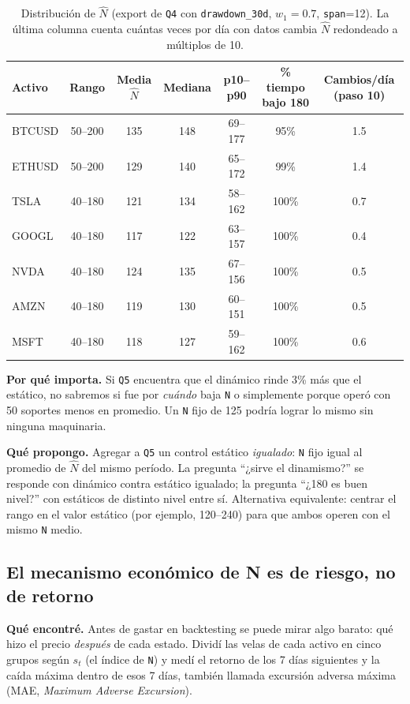 \documentclass[11pt,a4paper]{article}
\newcommand{\code}[1]{\texttt{\small #1}}
\begin{document}
\begin{table}[h]
\centering\small
\begin{tabular}{lcccccc}
\toprule
Activo & Rango & Media $\hat N$ & Mediana & p10--p90 & \% tiempo bajo 180 & Cambios/día (paso 10) \\
\midrule
BTCUSD & 50--200 & 135 & 148 & 69--177 & 95\% & 1.5 \\
ETHUSD & 50--200 & 129 & 140 & 65--172 & 99\% & 1.4 \\
TSLA   & 40--180 & 121 & 134 & 58--162 & 100\% & 0.7 \\
GOOGL  & 40--180 & 117 & 122 & 63--157 & 100\% & 0.4 \\
NVDA   & 40--180 & 124 & 135 & 67--156 & 100\% & 0.5 \\
AMZN   & 40--180 & 119 & 130 & 60--151 & 100\% & 0.5 \\
MSFT   & 40--180 & 118 & 127 & 59--162 & 100\% & 0.6 \\
\bottomrule
\end{tabular}
\caption{Distribución de $\hat N$ (export de \code{Q4} con \code{drawdown\_30d}, $w_1=0.7$, \code{span}=12).
La última columna cuenta cuántas veces por día con datos cambia $\hat N$ redondeado a múltiplos de 10.}
\label{tab:nivel}
\end{table}

\textbf{Por qué importa.} Si \code{Q5} encuentra que el dinámico rinde 3\% más que el estático, no
sabremos si fue por \emph{cuándo} baja \code{N} o simplemente porque operó con 50 soportes menos en
promedio. Un \code{N} fijo de 125 podría lograr lo mismo sin ninguna maquinaria.

\textbf{Qué propongo.} Agregar a \code{Q5} un control estático \emph{igualado}: \code{N} fijo igual al
promedio de $\hat N$ del mismo período. La pregunta ``¿sirve el dinamismo?'' se responde con dinámico
contra estático igualado; la pregunta ``¿180 es buen nivel?'' con estáticos de distinto nivel entre sí.
Alternativa equivalente: centrar el rango en el valor estático (por ejemplo, 120--240) para que ambos
operen con el mismo \code{N} medio.

\subsection{El mecanismo económico de N es de riesgo, no de retorno}\label{sec:riesgo}

\textbf{Qué encontré.} Antes de gastar en backtesting se puede mirar algo barato: qué hizo el precio
\emph{después} de cada estado. Dividí las velas de cada activo en cinco grupos según $s_t$ (el índice de
\code{N}) y medí el retorno de los 7 días siguientes y la caída máxima dentro de esos 7 días, también
llamada excursión adversa máxima (MAE, \emph{Maximum Adverse Excursion}).
\end{document}
